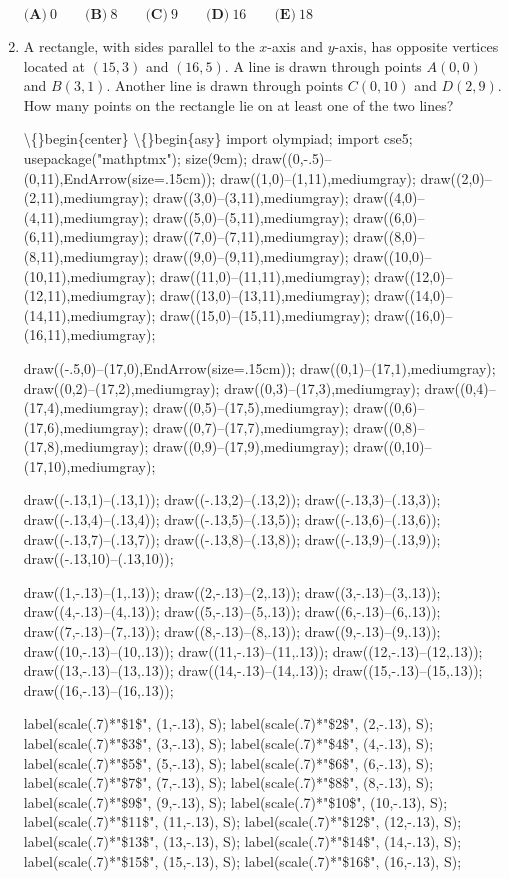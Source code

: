 \documentclass{article}
\begin{document}
\begin{enumerate}[label=\arabic*., itemsep=0.5em]
\(\textbf{(A)}\ 0 \qquad \textbf{(B)}\ 8 \qquad \textbf{(C)}\ 9 \qquad \textbf{(D)}\ 16 \qquad \textbf{(E)}\ 18\)\par \vspace{0.5em}\item A rectangle, with sides parallel to the \(x\)-axis and \(y\)-axis, has opposite vertices located at \((15, 3)\) and \((16, 5)\). A line is drawn through points \(A(0, 0)\) and \(B(3, 1)\). Another line is drawn through points \(C(0, 10)\) and \(D(2, 9)\). How many points on the rectangle lie on at least one of the two lines?

\textbackslash\{\}begin\{center\}
\textbackslash\{\}begin\{asy\}
import olympiad;
import cse5;
usepackage("mathptmx");
size(9cm);
draw((0,-.5)--(0,11),EndArrow(size=.15cm));
draw((1,0)--(1,11),mediumgray);
draw((2,0)--(2,11),mediumgray);
draw((3,0)--(3,11),mediumgray);
draw((4,0)--(4,11),mediumgray);
draw((5,0)--(5,11),mediumgray);
draw((6,0)--(6,11),mediumgray);
draw((7,0)--(7,11),mediumgray);
draw((8,0)--(8,11),mediumgray);
draw((9,0)--(9,11),mediumgray);
draw((10,0)--(10,11),mediumgray);
draw((11,0)--(11,11),mediumgray);
draw((12,0)--(12,11),mediumgray);
draw((13,0)--(13,11),mediumgray);
draw((14,0)--(14,11),mediumgray);
draw((15,0)--(15,11),mediumgray);
draw((16,0)--(16,11),mediumgray);

draw((-.5,0)--(17,0),EndArrow(size=.15cm));
draw((0,1)--(17,1),mediumgray);
draw((0,2)--(17,2),mediumgray);
draw((0,3)--(17,3),mediumgray);
draw((0,4)--(17,4),mediumgray);
draw((0,5)--(17,5),mediumgray);
draw((0,6)--(17,6),mediumgray);
draw((0,7)--(17,7),mediumgray);
draw((0,8)--(17,8),mediumgray);
draw((0,9)--(17,9),mediumgray);
draw((0,10)--(17,10),mediumgray);

draw((-.13,1)--(.13,1));
draw((-.13,2)--(.13,2));
draw((-.13,3)--(.13,3));
draw((-.13,4)--(.13,4));
draw((-.13,5)--(.13,5));
draw((-.13,6)--(.13,6));
draw((-.13,7)--(.13,7));
draw((-.13,8)--(.13,8));
draw((-.13,9)--(.13,9));
draw((-.13,10)--(.13,10));

draw((1,-.13)--(1,.13));
draw((2,-.13)--(2,.13));
draw((3,-.13)--(3,.13));
draw((4,-.13)--(4,.13));
draw((5,-.13)--(5,.13));
draw((6,-.13)--(6,.13));
draw((7,-.13)--(7,.13));
draw((8,-.13)--(8,.13));
draw((9,-.13)--(9,.13));
draw((10,-.13)--(10,.13));
draw((11,-.13)--(11,.13));
draw((12,-.13)--(12,.13));
draw((13,-.13)--(13,.13));
draw((14,-.13)--(14,.13));
draw((15,-.13)--(15,.13));
draw((16,-.13)--(16,.13));

label(scale(.7)*"\$1\$", (1,-.13), S);
label(scale(.7)*"\$2\$", (2,-.13), S);
label(scale(.7)*"\$3\$", (3,-.13), S);
label(scale(.7)*"\$4\$", (4,-.13), S);
label(scale(.7)*"\$5\$", (5,-.13), S);
label(scale(.7)*"\$6\$", (6,-.13), S);
label(scale(.7)*"\$7\$", (7,-.13), S);
label(scale(.7)*"\$8\$", (8,-.13), S);
label(scale(.7)*"\$9\$", (9,-.13), S);
label(scale(.7)*"\$10\$", (10,-.13), S);
label(scale(.7)*"\$11\$", (11,-.13), S);
label(scale(.7)*"\$12\$", (12,-.13), S);
label(scale(.7)*"\$13\$", (13,-.13), S);
label(scale(.7)*"\$14\$", (14,-.13), S);
label(scale(.7)*"\$15\$", (15,-.13), S);
label(scale(.7)*"\$16\$", (16,-.13), S);


\end{enumerate}
\end{document}
